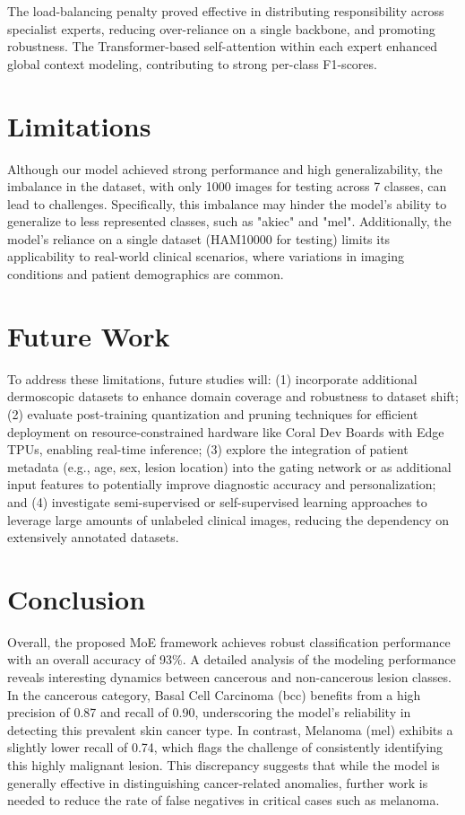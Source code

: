 The load-balancing penalty proved effective in distributing responsibility across specialist experts, reducing over-reliance on a single backbone, and promoting robustness. The Transformer-based self-attention within each expert enhanced global context modeling, contributing to strong per-class F1-scores.

\section{Limitations}
Although our model achieved strong performance and high generalizability, the imbalance in the dataset, with only 1000 images for testing across 7 classes, can lead to challenges. Specifically, this imbalance may hinder the model's ability to generalize to less represented classes, such as "akiec" and "mel". Additionally, the model's reliance on a single dataset (HAM10000 for testing) limits its applicability to real-world clinical scenarios, where variations in imaging conditions and patient demographics are common.    

\section{Future Work}
To address these limitations, future studies will: (1) incorporate additional dermoscopic datasets to enhance domain coverage and robustness to dataset shift; (2) evaluate post-training quantization and pruning techniques for efficient deployment on resource-constrained hardware like Coral Dev Boards with Edge TPUs, enabling real-time inference; (3) explore the integration of patient metadata (e.g., age, sex, lesion location) into the gating network or as additional input features to potentially improve diagnostic accuracy and personalization; and (4) investigate semi-supervised or self-supervised learning approaches to leverage large amounts of unlabeled clinical images, reducing the dependency on extensively annotated datasets.

\section{Conclusion}
Overall, the proposed MoE framework achieves robust classification performance with an overall accuracy of 93\%. A detailed analysis of the modeling performance reveals interesting dynamics between cancerous and non-cancerous lesion classes. In the cancerous category, Basal Cell Carcinoma (bcc) benefits from a high precision of 0.87 and recall of 0.90, underscoring the model's reliability in detecting this prevalent skin cancer type. In contrast, Melanoma (mel) exhibits a slightly lower recall of 0.74, which flags the challenge of consistently identifying this highly malignant lesion. This discrepancy suggests that while the model is generally effective in distinguishing cancer-related anomalies, further work is needed to reduce the rate of false negatives in critical cases such as melanoma.

